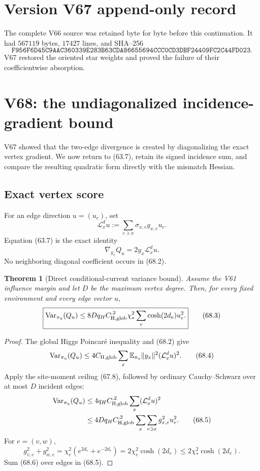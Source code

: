 \documentclass[11pt]{article}
\newtheorem{theorem}{Theorem}[section]
\theoremstyle{remark}
\begin{document}
\section*{Version V67 append-only record}
The complete V66 source was retained byte for byte before this
continuation.  It had \(567119\) bytes, \(17427\) lines, and SHA--256
\[
 \texttt{F956F6D45C9AAC360339E283B63CDA86655694CCC0CD3DBF24409FC2C44FD023}.
\]
V67 restored the oriented star weights and proved the failure of their
coefficientwise absorption.


\section{V68: the undiagonalized incidence-gradient bound}
\label{sec:v17v68}

V67 showed that the two-edge divergence is created by diagonalizing
the exact vertex gradient.  We now return to (63.7), retain its signed
incidence sum, and compare the resulting quadratic form directly with
the mismatch Hessian.

\subsection{Exact vertex score}

For an edge direction \(u=(u_e)\), set
\[
 \mathcal L_x^{d}u
 :=\sum_{e\ni x}\sigma_{x,e}g_{x,e}u_e.           \tag{68.1}
\]
Equation (63.7) is the exact identity
\[
 \nabla_{y_x}Q_u=2y_x\mathcal L_x^{d}u.           \tag{68.2}
\]
No neighboring diagonal coefficient occurs in (68.2).

\begin{theorem}[Direct conditional-current variance bound]
\label{thm:v17v68-current}
Assume the V61 influence margin and let \(D\) be the maximum vertex
degree.  Then, for every fixed environment and every edge vector
\(u\),
\[
\boxed{
 \operatorname{Var}_{\pi_\eta}(Q_u)
 \leq
 8Dq_HC_{\rm H,glob}^{,2}\chi_*^2
 \sum_e\cosh(2d_e)u_e^2.}                        \tag{68.3}
\]
\end{theorem}

\begin{proof}
The global Higgs Poincar\'e inequality and (68.2) give
\[
 \operatorname{Var}_{\pi_\eta}(Q_u)
 \leq
 4C_{\rm H,glob}
 \sum_x\mathbb E_{\pi_\eta}\|y_x\|^2
       (\mathcal L_x^{d}u)^2.                    \tag{68.4}
\]
Apply the site-moment ceiling (67.8), followed by ordinary
Cauchy--Schwarz over at most \(D\) incident edges:
\[
\begin{aligned}
 \operatorname{Var}_{\pi_\eta}(Q_u)
 &\leq4q_HC_{\rm H,glob}^{,2}
       \sum_x(\mathcal L_x^{d}u)^2\\
 &\leq4Dq_HC_{\rm H,glob}^{,2}
       \sum_x\sum_{e\ni x}g_{x,e}^2u_e^2.       \tag{68.5}
\end{aligned}
\]
For \(e=(v,w)\),
\[
 g_{v,e}^2+g_{w,e}^2
 =\chi_e^2(e^{2d_e}+e^{-2d_e})
 =2\chi_e^2\cosh(2d_e)
 \leq2\chi_*^2\cosh(2d_e).                      \tag{68.6}
\]
Sum (68.6) over edges in (68.5).
\end{proof}
\end{document}
